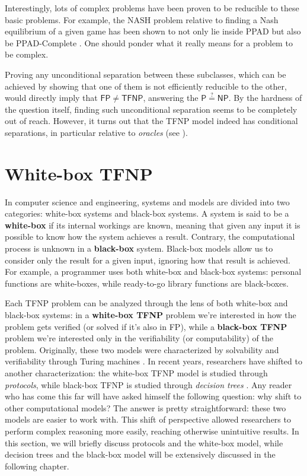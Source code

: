 Interestingly, lots of complex problems have been proven to be reducible to these basic problems. For example, the $\mathrm{NASH}$ problem relative to finding a Nash equilibrium of a given game has been shown to not only lie inside \textsf{PPAD} but also be \textsf{PPAD}-Complete \cite{nash_1, nash_2}. One should ponder what it really means for a problem to be complex.

Proving any unconditional separation between these subclasses, which can be achieved by showing that one of them is not efficiently reducible to the other, would directly imply that $\mathsf{FP} \neq \mathsf{TFNP}$, answering the $\mathsf{P} \stackrel{?}{=} \mathsf{NP}$. By the hardness of the question itself, finding such unconditional separation seems to be completely out of reach. However, it turns out that the \textsf{TFNP} model indeed has conditional separations, in particular relative to \textit{oracles} (see ).
 
\newpage

\section{White-box \textsf{TFNP}}

In computer science and engineering, systems and models are divided into two categories: white-box systems and black-box systems. A system is said to be a \textbf{white-box} if its internal workings are known, meaning that given any input it is possible to know how the system achieves a result. Contrary, the computational process is unknown in a \textbf{black-box} system. Black-box models allow us to consider only the result for a given input, ignoring how that result is achieved. For example, a programmer uses both white-box and black-box systems: personal functions are white-boxes, while ready-to-go library functions are black-boxes.

Each \textsf{TFNP} problem can be analyzed through the lens of both white-box and black-box systems: in a \textbf{white-box \textsf{TFNP}} problem we're interested in how the problem gets verified (or solved if it's also in \textsf{FP}), while a \textbf{black-box \textsf{TFNP}} problem we're interested only in the verifiability (or computability) of the problem. Originally, these two models were characterized by solvability and verifiability through Turing machines \cite{decision_vs_search,rel_comp_np_search}. In recent years, researchers have shifted to another characterization: the white-box \textsf{TFNP} model is studied through \textit{protocols}, while black-box \textsf{TFNP} is studied through \textit{decision trees} \cite{separations_proof_complexity, adventures_monotone_tfnp, tfnp_characterization}. Any reader who has come this far will have asked himself the following question: why shift to other computational models? The answer is pretty straightforward: these two models are easier to work with. This shift of perspective allowed researchers to perform complex reasoning more easily, reaching otherwise unintuitive results. In this section, we will briefly discuss protocols and the white-box model, while decision trees and the black-box model will be extensively discussed in the following chapter. 


